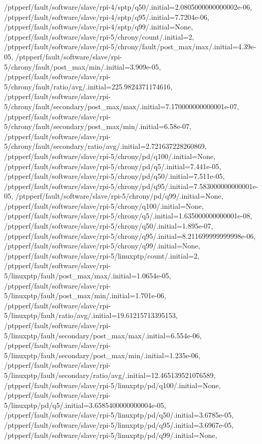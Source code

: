 {    /ptpperf/fault/software/slave/rpi-4/sptp/q50/.initial=2.0805000000000002e-06,
    /ptpperf/fault/software/slave/rpi-4/sptp/q95/.initial=7.7204e-06,
    /ptpperf/fault/software/slave/rpi-4/sptp/q99/.initial=None,
    /ptpperf/fault/software/slave/rpi-5/chrony/count/.initial=2,
    /ptpperf/fault/software/slave/rpi-5/chrony/fault/post_max/max/.initial=4.39e-05,
    /ptpperf/fault/software/slave/rpi-5/chrony/fault/post_max/min/.initial=3.909e-05,
    /ptpperf/fault/software/slave/rpi-5/chrony/fault/ratio/avg/.initial=225.9824371174616,
    /ptpperf/fault/software/slave/rpi-5/chrony/fault/secondary/post_max/max/.initial=7.170000000000001e-07,
    /ptpperf/fault/software/slave/rpi-5/chrony/fault/secondary/post_max/min/.initial=6.58e-07,
    /ptpperf/fault/software/slave/rpi-5/chrony/fault/secondary/ratio/avg/.initial=2.721637228260869,
    /ptpperf/fault/software/slave/rpi-5/chrony/pd/q100/.initial=None,
    /ptpperf/fault/software/slave/rpi-5/chrony/pd/q5/.initial=7.441e-05,
    /ptpperf/fault/software/slave/rpi-5/chrony/pd/q50/.initial=7.511e-05,
    /ptpperf/fault/software/slave/rpi-5/chrony/pd/q95/.initial=7.583000000000001e-05,
    /ptpperf/fault/software/slave/rpi-5/chrony/pd/q99/.initial=None,
    /ptpperf/fault/software/slave/rpi-5/chrony/q100/.initial=None,
    /ptpperf/fault/software/slave/rpi-5/chrony/q5/.initial=1.635000000000001e-08,
    /ptpperf/fault/software/slave/rpi-5/chrony/q50/.initial=1.895e-07,
    /ptpperf/fault/software/slave/rpi-5/chrony/q95/.initial=8.211699999999998e-06,
    /ptpperf/fault/software/slave/rpi-5/chrony/q99/.initial=None,
    /ptpperf/fault/software/slave/rpi-5/linuxptp/count/.initial=2,
    /ptpperf/fault/software/slave/rpi-5/linuxptp/fault/post_max/max/.initial=1.0654e-05,
    /ptpperf/fault/software/slave/rpi-5/linuxptp/fault/post_max/min/.initial=1.701e-06,
    /ptpperf/fault/software/slave/rpi-5/linuxptp/fault/ratio/avg/.initial=19.61215713395153,
    /ptpperf/fault/software/slave/rpi-5/linuxptp/fault/secondary/post_max/max/.initial=6.554e-06,
    /ptpperf/fault/software/slave/rpi-5/linuxptp/fault/secondary/post_max/min/.initial=1.235e-06,
    /ptpperf/fault/software/slave/rpi-5/linuxptp/fault/secondary/ratio/avg/.initial=12.465139521076589,
    /ptpperf/fault/software/slave/rpi-5/linuxptp/pd/q100/.initial=None,
    /ptpperf/fault/software/slave/rpi-5/linuxptp/pd/q5/.initial=3.6585400000000004e-05,
    /ptpperf/fault/software/slave/rpi-5/linuxptp/pd/q50/.initial=3.6785e-05,
    /ptpperf/fault/software/slave/rpi-5/linuxptp/pd/q95/.initial=3.6967e-05,
    /ptpperf/fault/software/slave/rpi-5/linuxptp/pd/q99/.initial=None,
}
